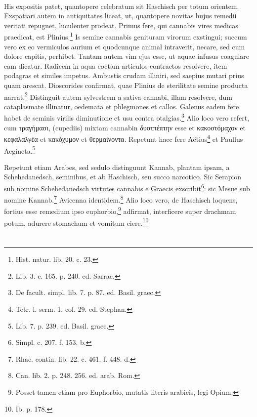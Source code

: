 \documentclass[a4paper, 11pt, oneside, polutonikogreek, german]{article}
\begin{document}
\paragraph{}
His expositis patet, quantopere celebratum sit Haschisch per totum orientem. Exspatiari autem in antiquitates liceat, ut, quantopere novitas hujus remedii veritati repugnet, luculenter prodeat. Primus fere, qui cannabis vires medicas praedicat, est Plinius.\footnote{Hist. natur. lib. 20. c. 23.} Is semine cannabis genituram virorum exstingui; succum vero ex eo vermiculos aurium et quodcunque animal intraverit, necare, sed cum dolore capitis, perhibet. Tantam autem vim ejus esse, ut aquae infusus coagulare eam dicatur. Radicem in aqua coctam articulos contractos resolvere, item podagras et similes impetus. Ambustis crudam illiniri, sed saepius mutari prius quam arescat. Dioscorides confirmat, quae Plinius de sterilitate semine producta narrat.\footnote{Lib. 3. c. 165. p. 240. ed. Sarrac.} Distinguit autem sylvestrem a sativa cannabi, illam resolvere, dum cataplasmate illinatur, oedemata et phlegmones et callos. Galenus eadem fere habet de seminis virilis diminutione et usu contra otalgias.\footnote{De facult. simpl. lib. 7. p. 87. ed. Basil. graec.} Alio loco vero refert, cum τραγήμασι, (cupediis) mixtam cannabin δυστπέπτην esse et κακοστόμαχον et κεφαλαλγέα et κακόχυμον et θερμαίνοντα. Repetunt haec fere Aëtius\footnote{Tetr. l. serm. 1. col. 29. ed. Stephan.} et Paullus Aegineta.\footnote{Lib. 7. p. 239. ed. Basil. graec.}

Repetunt etiam Arabes, sed sedulo distinguunt Kannab, plantam ipsam, a Schehedanedsch, seminibus, et ab Haschisch, seu succo narcotico. Sic Serapion sub nomine Schehedanedsch virtutes cannabis e Graecis exscribit\footnote{Simpl. c. 207. f. 153. b.}: sic Mesue sub nomine Kannab.\footnote{Rhac. contin. lib. 22. c. 461. f. 448. d.} Avicenna identidem.\footnote{Can. lib. 2. p. 248. 256. ed. arab. Rom.} Alio loco vero, de Haschisch loquens, fortius esse remedium ipso euphorbio,\footnote{Posset tamen etiam pro Euphorbio, mutatis literis arabicis, legi Opium.} adfirmat, interficere super drachmam potum, adurere stomachum et vomitum ciere.\footnote{Ib. p. 178.}
\section{}
\end{document}
